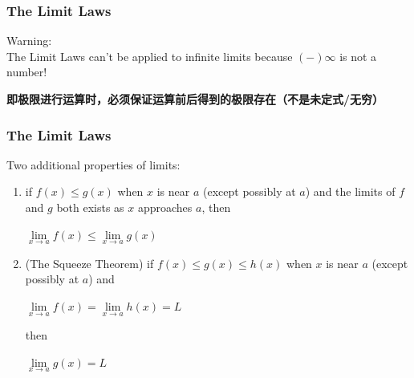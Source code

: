 \begin{frame}
	\frametitle{The Limit Laws}
	\alert{Warning:}\\
	The Limit Laws can't be applied to infinite limits because $(-)\infty$ is not a number!

	\textbf{即极限进行运算时，必须保证运算前后得到的极限存在（不是未定式/无穷）}
\end{frame}
\begin{frame}
	\frametitle{The Limit Laws}
	Two additional properties of limits:
	\begin{enumerate}
		\item if $f(x) \leq g(x)$ when $x$ is near $a$ (\alert{except possibly} at $a$) and the limits of $f$ and $g$ both exists as $x$ approaches $a$, then
		      \begin{center}
			      $\lim\limits_{\textit{x} \to a}f(x) \leq \lim\limits_{\textit{x} \to a}g(x)$
		      \end{center}
		\item \alert{(The Squeeze Theorem)} if $f(x) \leq g(x) \leq h(x)$ when $x$ is near $a$ (\alert{except possibly} at $a$) and
		      \begin{center}
			      $\lim\limits_{\textit{x} \to a}f(x) = \lim\limits_{\textit{x} \to a}h(x) = L$
		      \end{center}
		      then
		      \begin{center}
			      $\lim\limits_{\textit{x} \to a}g(x) = L$
		      \end{center}
	\end{enumerate}
\end{frame}

